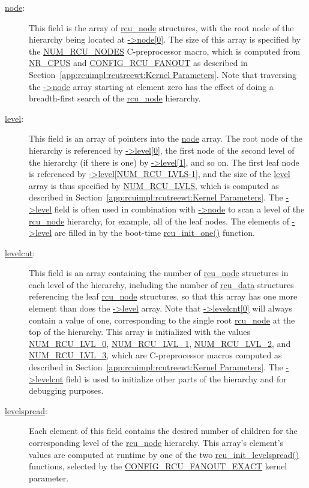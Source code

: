 \begin{description}
\item[\url{node}:]
	This field is the array of \url{rcu_node} structures,
	with the root node of the hierarchy being located at
	\url{->node[0]}.
	The size of this array is specified by the
	\url{NUM_RCU_NODES} C-preprocessor macro, which is computed
	from \url{NR_CPUS} and \url{CONFIG_RCU_FANOUT}
	as described in
	Section~\ref{app:rcuimpl:rcutreewt:Kernel Parameters}.
	Note that traversing the \url{->node} array starting at
	element zero has the effect of doing a breadth-first search
	of the \url{rcu_node} hierarchy.
\item[\url{level}:]
	This field is an array of pointers into the \url{node} array.
	The root node of the hierarchy is referenced by
	\url{->level[0]}, the first node of the second level of
	the hierarchy (if there is one) by \url{->level[1]}, and so on.
	The first leaf node is referenced by
	\url{->level[NUM_RCU_LVLS-1]}, and the size of the \url{level}
	array is thus specified by \url{NUM_RCU_LVLS}, which is
	computed as described in
	Section~\ref{app:rcuimpl:rcutreewt:Kernel Parameters}.
	The \url{->level} field is often used in combination with 
	\url{->node} to scan a level of the \url{rcu_node} hierarchy,
	for example, all of the leaf nodes.
	The elements of \url{->level} are filled in by the
	boot-time \url{rcu_init_one()} function.
\item[\url{levelcnt}:]
	This field is an array containing the number of \url{rcu_node}
	structures in each level of the hierarchy, including the
	number of \url{rcu_data} structures referencing the leaf
	\url{rcu_node} structures, so that this array has one more
	element than does the \url{->level} array.
	Note that \url{->levelcnt[0]} will always contain a value of
	one, corresponding to the single root \url{rcu_node} at the
	top of the hierarchy.
	This array is initialized with the values
	\url{NUM_RCU_LVL_0},
	\url{NUM_RCU_LVL_1},
	\url{NUM_RCU_LVL_2}, and
	\url{NUM_RCU_LVL_3},
	which are C-preprocessor macros computed as described in
	Section~\ref{app:rcuimpl:rcutreewt:Kernel Parameters}.
	The \url{->levelcnt} field is used to initialize
	other parts of the hierarchy and for debugging purposes.
\item[\url{levelspread}:]
	Each element of this field contains the desired number of children
	for the corresponding level of the \url{rcu_node} hierarchy.
	This array's element's values are computed at runtime
	by one of the two \url{rcu_init_levelspread()} functions,
	selected by the \url{CONFIG_RCU_FANOUT_EXACT} kernel parameter.

\end{description}
